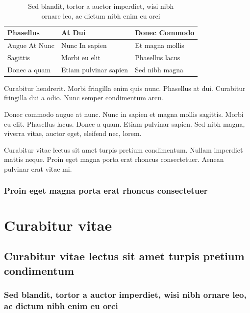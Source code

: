 \documentclass[cfonts]{nostarch}
\begin{document}
\begin{table}[tp]
  \caption[Sed blandit, tortor a auctor]{Sed blandit, tortor a auctor
    imperdiet, wisi nibh\\ ornare leo, 
    ac dictum nibh enim eu orci}
  \tbfont
  \begin{tabular}{@{}lll}
    \toprule\let\normalfont=\bfseries%
    \thfont Phasellus &  \thfont At Dui       & \thfont Donec Commodo \\
    \midrule    
     Augue At Nunc    & Nunc In  sapien       & Et magna mollis \\
     Sagittis         &  Morbi eu elit        &  Phasellus lacus\\
     Donec a quam     & Etiam pulvinar sapien & Sed nibh magna\\
    \bottomrule
  \end{tabular}
\label{tab:one}
\end{table}

\lipsum[60]

Curabitur hendrerit. Morbi fringilla enim
  quis nunc. Phasellus at dui. Curabitur fringilla dui a odio.
  Nunc semper condimentum arcu. 
\begin{note}
  Donec commodo augue at nunc. Nunc in sapien et magna mollis
  sagittis. Morbi eu elit. Phasellus lacus.  Donec a quam. Etiam
  pulvinar sapien. Sed nibh magna, viverra vitae, auctor eget,
  eleifend nec, lorem.
\end{note}
Curabitur vitae lectus sit amet turpis pretium condimentum. Nullam
imperdiet mattis neque. Proin eget magna porta erat rhoncus
consectetuer. Aenean pulvinar erat vitae mi.

\section{Proin eget magna porta erat rhoncus consectetuer}

\lipsum[123-124]

\part{Curabitur vitae}

\chapter[Curabitur vitae lectus]{Curabitur vitae lectus sit amet
  turpis pretium condimentum}{}



\lipsum[43-48]

\section{Sed blandit, tortor a auctor imperdiet, wisi nibh ornare leo,
  ac dictum nibh enim eu orci}

\lipsum[94-98]
\end{document}
